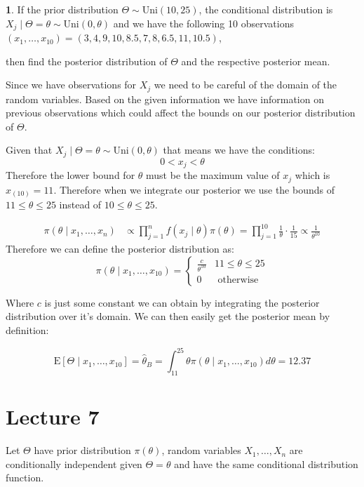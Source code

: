 \documentclass[english,12pt]{article}
\theoremstyle{plain}
\theoremstyle{definition}
\newtheorem*{example}{\protect\examplename}
\theoremstyle{definition} %
\providecommand{\examplename}{Example}
\newcommand{\ex}[1]{\mbox{E} \left[ #1 \right]}
\begin{document}
\begin{example}
If the prior distribution $\Theta\sim \text{Uni}(10,25)$,  the conditional distribution is $X_j\mid\Theta=\theta\sim \text{Uni}(0,\theta)$ and we have the following 10 observations $(x_1,\ldots,x_{10})=(3,4,9,10,8.5,7,8,6.5,11,10.5)$,

then find the posterior distribution of $\Theta$ and the respective posterior mean.

Since we have observations for $X_j$ we need to be careful of the domain of the random variables.  Based on the given information we have information on previous observations which could affect the bounds on our posterior distribution of $\Theta$.

Given that $X_j\mid\Theta=\theta\sim \text{Uni}(0,\theta)$ that means we have the conditions:
\[0<x_j<\theta\]
Therefore the lower bound for $\theta$ must be the maximum value of $x_j$ which is $x_{(10)}=11$.  Therefore when we integrate our posterior we use the bounds of $11\le\theta\le 25$ instead of $10\le\theta\le 25$.

\begin{align*}
\pi(\theta\mid x_1,\ldots,x_n)&\propto\prod_{j=1}^nf(x_j\mid\theta)\pi(\theta)
=\prod_{j=1}^{10}\frac{1}{\theta}\cdot\frac{1}{15}
\propto \frac{1}{\theta^{10}}
\end{align*}
Therefore we can define the posterior distribution as:
\[\pi(\theta\mid x_1,\ldots,x_{10})=\begin{cases}
\frac{c}{\theta^{10}} & 11\le\theta\le 25\\
0 & \text{ otherwise}
\end{cases}\]

Where $c$ is just some constant we can obtain by integrating the posterior distribution over it's domain.  We can then easily get the posterior mean by definition:

\[\ex{\Theta\mid x_1,\ldots,x_{10}}=
\hat\theta_B
=\int_{11}^{25}\theta\pi(\theta\mid x_1,\ldots,x_{10})d\theta
=12.37\]

\end{example}

\section*{Lecture 7}
Let $\Theta$ have prior distribution $\pi(\theta)$, random variables $X_1,\ldots,X_n$ are conditionally independent given $\Theta=\theta$ and have the same conditional distribution function.
\end{document}

